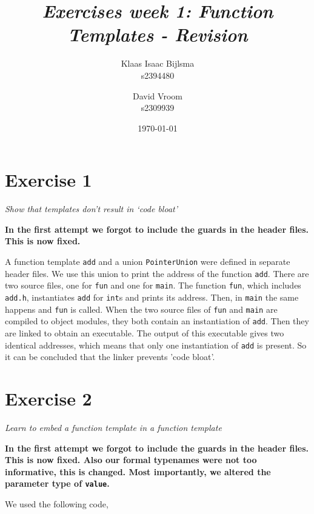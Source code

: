 \documentclass[12pt]{article}
\title{\itshape Exercises week 1: Function Templates - Revision}
\author{
	Klaas Isaac Bijlsma \\ s2394480
	\and
	David Vroom \\ s2309939
}
\date{\today}
\newcommand{\desc}[1]{\textit{#1} \vspace{1em}}
\begin{document}
\maketitle

\section*{Exercise 1}
\desc{Show that templates don't result in `code bloat'}

\textbf{In the first attempt we forgot to include the guards in the header files. This is now fixed.}

A function template \texttt{add} and a union \texttt{PointerUnion} were defined in separate header files. We use this union to print the address of the function \texttt{add}. There are two source files, one for \texttt{fun} and one for \texttt{main}. The function \texttt{fun}, which includes \texttt{add.h}, instantiates \texttt{add} for \texttt{int}s and prints its address. Then, in \texttt{main} the same happens and \texttt{fun} is called. When the two source files of \texttt{fun} and \texttt{main} are compiled to object modules, they both contain an instantiation of \texttt{add}. Then they are linked to obtain an executable. The output of this executable gives two identical addresses, which means that only one instantiation of \texttt{add} is present. So it can be concluded that the linker prevents 'code bloat'.







\clearpage


\section*{Exercise 2}
\desc{Learn to embed a function template in a function template}

\textbf{In the first attempt we forgot to include the guards in the header files. This is now fixed. Also our formal typenames were not too informative, this is changed. Most importantly, we altered the parameter type of \texttt{value}.}

We used the following code,



\end{document}
